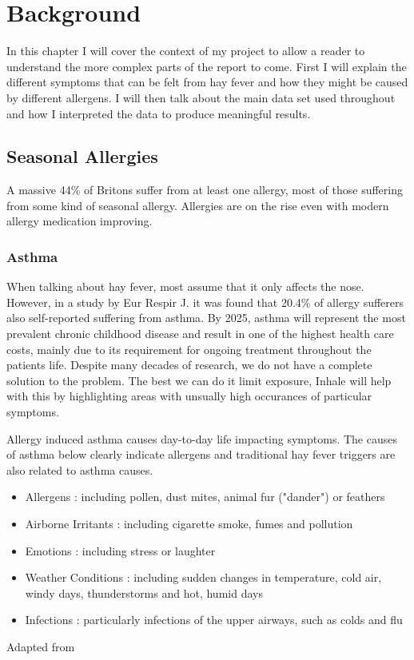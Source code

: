 \chapter{Background}
\label{cha:back}

In this chapter I will cover the context of my project to allow a reader to understand the more complex parts of the report to come. First I will explain the different symptoms that can be felt from hay fever and how they might be caused by different allergens. I will then talk about the main data set used throughout and how I interpreted the data to produce meaningful results.

\section{Seasonal Allergies}
A massive 44\% of Britons suffer from at least one allergy, most of those suffering from some kind of seasonal allergy. Allergies are on the rise even with modern allergy medication improving.
\cite{mintelallergy}

\subsection{Asthma}
When talking about hay fever, most assume that it only affects the nose. However, in a study by Eur Respir J. it was found that 20.4\% of allergy sufferers also self-reported suffering from asthma\cite{rhinitis}. By 2025, asthma will represent the most prevalent chronic childhood disease and result in one of the highest health care costs, mainly due to its requirement for ongoing treatment throughout the patients life\cite{childhood}. Despite many decades of research, we do not have a complete solution to the problem. The best we can do it limit exposure, Inhale will help with this by highlighting areas with unsually high occurances of particular symptoms.

Allergy induced asthma causes day-to-day life impacting symptoms. The causes of asthma below clearly indicate allergens and traditional hay fever triggers are also related to asthma causes.\\


\begin{itemize}
  \item Allergens : including pollen, dust mites, animal fur ("dander") or feathers
  \item Airborne Irritants : including cigarette smoke, fumes and pollution
  \item Emotions : including stress or laughter
  \item Weather Conditions : including sudden changes in temperature, cold air, windy days, thunderstorms and hot, humid days
  \item Infections : particularly infections of the upper airways, such as colds and flu
\end{itemize}Adapted from \cite{urlasthmacauses}\\

